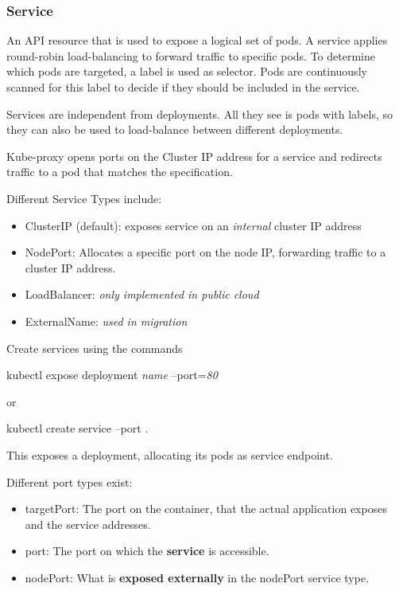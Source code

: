\subsubsection{Service}
An API resource that is used to expose a logical set of pods. A service applies round-robin load-balancing to forward traffic to specific pods. 
To determine which pods are targeted, a label is used as selector. 
Pods are continuously scanned for this label to decide if they should be included in the service.

Services are independent from deployments. All they see is pods with labels, so they can also be used to load-balance between different deployments.

Kube-proxy opens ports on the Cluster IP address for a service and redirects traffic to a pod that matches the specification.

Different Service Types include:

\begin{itemize}
    \item ClusterIP (default): exposes service on an \emph{internal} cluster IP address
    \item NodePort: Allocates a specific port on the node IP, forwarding traffic to a cluster IP address. 
    \item LoadBalancer: \emph{only implemented in public cloud}
    \item ExternalName: \emph{used in migration}
\end{itemize}

\noindent Create services using the commands

\ttfamily kubectl expose deployment \emph{name} --port=\emph{80} \rmfamily 

\noindent or 

\ttfamily kubectl create service --port \rmfamily.

\noindent
This exposes a deployment, allocating its pods as service endpoint.

\vspace{3mm}\noindent
Different port types exist:
\begin{itemize}
    \item targetPort: The port on the container, that the actual application exposes and the service addresses.
    \item port: The port on which the \textbf{service} is accessible.
    \item nodePort: What is \textbf{exposed externally} in the nodePort service type.
\end{itemize}

